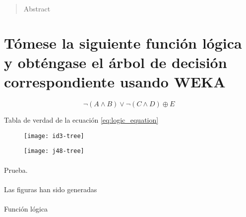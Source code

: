 \documentclass[10pt, a4paper,spanish]{article}
\begin{document}
	\maketitle %

	\thispagestyle{fancy} %



	\begin{abstract}
		\noindent Abstract
	\end{abstract}



  \section{Tómese la siguiente función lógica y obténgase el árbol de decisión correspondiente usando WEKA}

		\begin{equation}
			\label{eq:logic_equation}
			\neg(A \land B) \lor \neg(C \land D) \oplus E
		\end{equation}

		\begin{table}[p]
			\begin{center}
			\end{center}
			\caption{Tabla de verdad de la ecuación \ref{eq:logic_equation}}
			\label{eq:truth_table}
		\end{table}


		\begin{figure}[h]
			\begin{center}
				\texttt{[image: id3-tree]}
			\end{center}
			\caption{}
			\label{}
		\end{figure}

		\begin{figure}[h]
			\begin{center}
				\texttt{[image: j48-tree]}
			\end{center}
			\caption{}
			\label{}
		\end{figure}

    \paragraph{}
		Prueba.

		\paragraph{}
		Las figuras han sido generadas\cite{github:ismtabo-treetograph}

		\paragraph{}
		Función lógica \cite{github:garciparedes-python-examples}

	\nocite{subject:taa}
  
  
\end{document}
